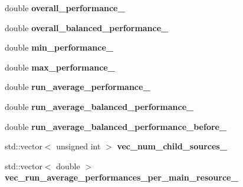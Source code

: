 \begin{DoxyCompactItemize}
\item 
\hypertarget{structStruct__PerformanceMonitoring_ada27304bbb88f857e4d732510127e1ae}{double {\bfseries overall\-\_\-performance\-\_\-}}\label{structStruct__PerformanceMonitoring_ada27304bbb88f857e4d732510127e1ae}

\item 
\hypertarget{structStruct__PerformanceMonitoring_a08bc2db12b9e3a773ba69f5183615f51}{double {\bfseries overall\-\_\-balanced\-\_\-performance\-\_\-}}\label{structStruct__PerformanceMonitoring_a08bc2db12b9e3a773ba69f5183615f51}

\item 
\hypertarget{structStruct__PerformanceMonitoring_af00d1d134575d0f5ccc3088bc468ab89}{double {\bfseries min\-\_\-performance\-\_\-}}\label{structStruct__PerformanceMonitoring_af00d1d134575d0f5ccc3088bc468ab89}

\item 
\hypertarget{structStruct__PerformanceMonitoring_a6a66143217c890e69bde67de78a38c80}{double {\bfseries max\-\_\-performance\-\_\-}}\label{structStruct__PerformanceMonitoring_a6a66143217c890e69bde67de78a38c80}

\item 
\hypertarget{structStruct__PerformanceMonitoring_a05d5a654c9026decca3ea69752d7ef61}{double {\bfseries run\-\_\-average\-\_\-performance\-\_\-}}\label{structStruct__PerformanceMonitoring_a05d5a654c9026decca3ea69752d7ef61}

\item 
\hypertarget{structStruct__PerformanceMonitoring_a2dcbd8f140c688c7efc2f5c755074d01}{double {\bfseries run\-\_\-average\-\_\-balanced\-\_\-performance\-\_\-}}\label{structStruct__PerformanceMonitoring_a2dcbd8f140c688c7efc2f5c755074d01}

\item 
\hypertarget{structStruct__PerformanceMonitoring_ab346e075b6035bd4cc75f4c6a3536c98}{double {\bfseries run\-\_\-average\-\_\-balanced\-\_\-performance\-\_\-before\-\_\-}}\label{structStruct__PerformanceMonitoring_ab346e075b6035bd4cc75f4c6a3536c98}

\item 
\hypertarget{structStruct__PerformanceMonitoring_a55cf855d80649986fbb2530ea0fe80ba}{std\-::vector$<$ unsigned int $>$ {\bfseries vec\-\_\-num\-\_\-child\-\_\-sources\-\_\-}}\label{structStruct__PerformanceMonitoring_a55cf855d80649986fbb2530ea0fe80ba}

\item 
\hypertarget{structStruct__PerformanceMonitoring_a3b3938a4d94d1432357d6f577aba7839}{std\-::vector$<$ double $>$ {\bfseries vec\-\_\-run\-\_\-average\-\_\-performances\-\_\-per\-\_\-main\-\_\-resource\-\_\-}}\label{structStruct__PerformanceMonitoring_a3b3938a4d94d1432357d6f577aba7839}


\end{DoxyCompactItemize}
